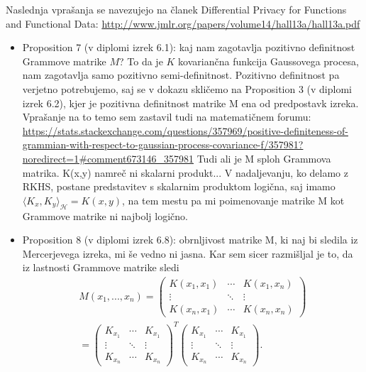 \documentclass[12pt,a4paper]{amsart}
\theoremstyle{definition} %
\theoremstyle{plain} %
\begin{document}
Naslednja vprašanja se navezujejo na članek Differential Privacy for Functions and Functional Data: \url{http://www.jmlr.org/papers/volume14/hall13a/hall13a.pdf}
\newline
\begin{itemize}
\item Proposition 7 (v diplomi izrek 6.1): kaj nam zagotavlja pozitivno definitnost Grammove matrike $M$? To da je $K$ kovariančna funkcija Gaussovega procesa, nam zagotavlja samo pozitivno semi-definitnost. Pozitivno definitnost pa verjetno potrebujemo, saj se v dokazu skličemo na Proposition 3 (v diplomi izrek 6.2), kjer je pozitivna definitnost matrike M ena od predpostavk izreka. Vprašanje na to temo sem zastavil tudi na matematičnem forumu: \url{https://stats.stackexchange.com/questions/357969/positive-definiteness-of-grammian-with-respect-to-gaussian-process-covariance-f/357981?noredirect=1#comment673146_357981}
\newline
\newline
Tudi ali je M sploh Grammova matrika. K(x,y) namreč ni skalarni produkt... V nadaljevanju, ko delamo z RKHS, postane predstavitev s skalarnim produktom logična, saj imamo $\langle K_x, K_y \rangle_{\mathcal{H}} = K(x,y)$, na tem mestu pa mi poimenovanje matrike M kot Grammove matrike ni najbolj logično.
\newline
\item Proposition 8  (v diplomi izrek 6.8): obrnljivost matrike M, ki naj bi sledila iz Mercerjevega izreka, mi še vedno ni jasna. Kar sem sicer razmišljal je to, da iz lastnosti Grammove matrike sledi 
\begin{gather*}
M(x_1,...,x_n) = 
 \begin{pmatrix}
  K(x_1,x_1) & \cdots & K(x_1,x_n) \\
  \vdots    & \ddots & \vdots  \\
  K(x_n,x_1) & \cdots & K(x_n,x_n) 
 \end{pmatrix} \\ = 
  \begin{pmatrix}
  K_{x_1} & \cdots & K_{x_1} \\
  \vdots    & \ddots & \vdots  \\
  K_{x_n} & \cdots & K_{x_n} 
 \end{pmatrix}^T 
  \begin{pmatrix}
  K_{x_1} & \cdots & K_{x_1} \\
  \vdots    & \ddots & \vdots  \\
  K_{x_n} & \cdots & K_{x_n} 
 \end{pmatrix}.

\end{gather*}
\end{itemize}
\end{document}
